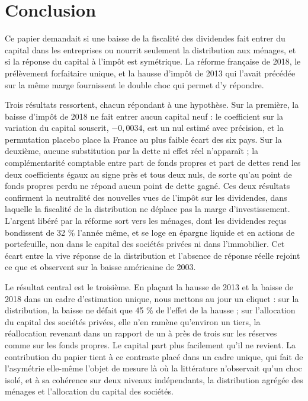 \section{Conclusion}\label{sec:conclusion}

Ce papier demandait si une baisse de la fiscalité des dividendes fait entrer du capital dans les
entreprises ou nourrit seulement la distribution aux ménages, et si la réponse du capital à l'impôt
est symétrique. La réforme française de 2018, le prélèvement forfaitaire unique, et la hausse
d'impôt de 2013 qui l'avait précédée sur la même marge fournissent le double choc qui permet d'y
répondre.

Trois résultats ressortent, chacun répondant à une hypothèse. Sur la première, la baisse d'impôt de
2018 ne fait entrer aucun capital neuf : le coefficient sur la variation du capital souscrit,
$-0{,}0034$, est un nul estimé avec précision, et la permutation placebo place la France au plus
faible écart des six pays. Sur la deuxième, aucune substitution par la dette ni effet réel
n'apparaît ; la complémentarité comptable entre part de fonds propres et part de dettes rend les
deux coefficients égaux au signe près et tous deux nuls, de sorte qu'au point de fonds propres perdu
ne répond aucun point de dette gagné. Ces deux résultats confirment la neutralité des nouvelles vues
de l'impôt sur les dividendes, dans laquelle la fiscalité de la distribution ne déplace pas la marge
d'investissement. L'argent libéré par la réforme sort vers les ménages, dont les dividendes reçus
bondissent de 32 \% l'année même, et se loge en épargne liquide et en actions de portefeuille, non
dans le capital des sociétés privées ni dans l'immobilier. Cet écart entre la vive réponse de la
distribution et l'absence de réponse réelle rejoint ce que \citet{chetty2005} et \citet{yagan2015}
observent sur la baisse américaine de 2003.

Le résultat central est le troisième. En plaçant la hausse de 2013 et la baisse de 2018 dans un
cadre d'estimation unique, nous mettons au jour un cliquet : sur la distribution, la baisse ne défait
que 45 \% de l'effet de la hausse ; sur l'allocation du capital des sociétés privées, elle n'en
ramène qu'environ un tiers, la réallocation revenant dans un rapport de un à près de trois sur les
réserves comme sur les fonds propres. Le capital part plus facilement qu'il ne revient. La
contribution du papier tient à ce contraste placé dans un cadre unique, qui fait de l'asymétrie
elle-même l'objet de mesure là où la littérature n'observait qu'un choc isolé, et à sa cohérence sur
deux niveaux indépendants, la distribution agrégée des ménages et l'allocation du capital des
sociétés.

